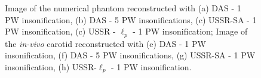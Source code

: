 \documentclass[conference]{IEEEtran}
\begin{document}
\begin{figure}[htb]
	\hfill%
	\hfill\null%
	\caption{Image of the numerical phantom reconstructed with (a) DAS - 1 PW insonification, (b) DAS - 5 PW insonifications, (c) USSR-SA - 1 PW insonification, (c) USSR - $\ell_p$ - 1 PW insonification; Image of the \textit{in-vivo} carotid reconstructed with (e) DAS - 1 PW insonification, (f) DAS - 5 PW insonifications, (g) USSR-SA - 1 PW insonification, (h) USSR-$\ell_p$ - 1 PW insonification.}
	\label{fig_Bmode}
\end{figure} 
\end{document}
